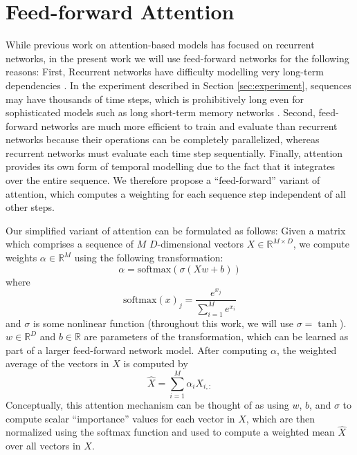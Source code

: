 \documentclass{article}
\begin{document}
\section{Feed-forward Attention}
\label{sec:model}

While previous work on attention-based models has focused on recurrent networks, in the present work we will use feed-forward networks for the following reasons:
First, Recurrent networks have difficulty modelling very long-term dependencies \cite{bengio1994learning}.
In the experiment described in Section \ref{sec:experiment}, sequences may have thousands of time steps, which is prohibitively long even for sophisticated models such as long short-term memory networks \cite{hochreiter1997long}.
Second, feed-forward networks are much more efficient to train and evaluate than recurrent networks because their operations can be completely parallelized, whereas recurrent networks must evaluate each time step sequentially.
Finally, attention provides its own form of temporal modelling due to the fact that it integrates over the entire sequence.
We therefore propose a ``feed-forward'' variant of attention, which computes a weighting for each sequence step independent of all other steps.

Our simplified variant of attention can be formulated as follows:
Given a matrix which comprises a sequence of $M$ $D$-dimensional vectors $X \in \mathbb{R}^{M \times D}$, we compute weights $\alpha \in \mathbb{R}^M$ using the following transformation:
\begin{equation}
\label{eq:alpha}
\alpha = \mathrm{softmax}(\sigma(Xw + b))
\end{equation}
where
$$
\mathrm{softmax}(x)_j = \frac{e^{x_j}}{\sum_{i = 1}^M e^{x_i}}
$$
and $\sigma$ is some nonlinear function (throughout this work, we will use $\sigma = \tanh$).
$w \in \mathbb{R}^D$ and $b \in \mathbb{R}$ are parameters of the transformation, which can be learned as part of a larger feed-forward network model.
After computing $\alpha$, the weighted average of the vectors in $X$ is computed by
$$
\hat{X} = \sum_{i = 1}^M \alpha_i X_{i, :}
$$
Conceptually, this attention mechanism can be thought of as using $w$, $b$, and $\sigma$ to compute scalar ``importance'' values for each vector in $X$, which are then normalized using the softmax function and used to compute a weighted mean $\hat{X}$ over all vectors in $X$.
\end{document}
